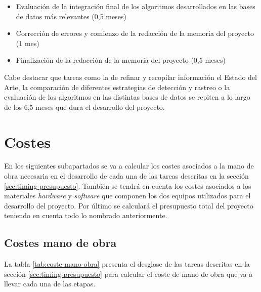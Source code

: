 \begin{itemize}
\item Evaluación de la integración final de los algoritmos desarrollados en las bases de datos más relevantes (0,5 meses)

\item Corrección de errores y comienzo de la redacción de la memoria del proyecto (1 mes)

\item Finalización de la redacción de la memoria del proyecto (0,5 meses)
  
\end{itemize}

Cabe destacar que tareas como la de refinar y recopilar información el Estado del Arte, la comparación de diferentes estrategias de detección y rastreo o la evaluación de los algoritmos en las distintas bases de datos se repiten a lo largo de los 6,5 meses que dura el desarrollo del proyecto.

\section{Costes}
\label{sec:costes-presupuesto}

En los siguientes subapartados se va a calcular los costes asociados a la mano de obra necesaria en el desarrollo de cada una de las tareas descritas en la sección \ref{sec:timing-presupuesto}. También se tendrá en cuenta los costes asociados a los materiales \textit{hardware} y \textit{software} que componen los dos equipos utilizados para el desarrollo del proyecto. Por último se calculará el presupuesto total del proyecto teniendo en cuenta todo lo nombrado anteriormente.

\subsection{Costes mano de obra}
\label{subsec:costes-mano-obra}

La tabla \ref{tab:coste-mano-obra} presenta el desglose de las tareas descritas en la sección \ref{sec:timing-presupuesto} para calcular el coste de mano de obra que va a llevar cada una de las etapas.

\vspace{0.5cm}

